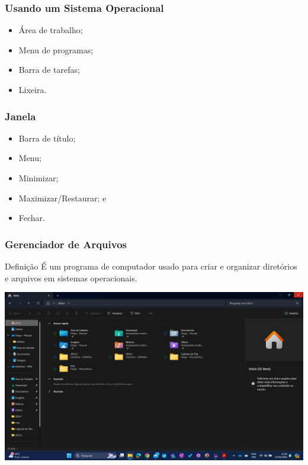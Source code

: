 \documentclass[aspectratio=169]{beamer} %
\begin{document}
\begin{frame}
	\frametitle{Usando um Sistema Operacional}
	
	\begin{itemize}
		\item Área de trabalho;
		\item Menu de programas;
		\item Barra de tarefas;
		\item Lixeira.
	\end{itemize}
\end{frame}

\begin{frame}
	\frametitle{Janela}
	
	\begin{itemize}
		\item Barra de título;
		\item Menu;
		\item Minimizar;
		\item Maximizar/Restaurar; e
		\item Fechar.
	\end{itemize}
\end{frame}

\begin{frame}
	\frametitle{Gerenciador de Arquivos}
	
	\begin{block}{Definição}
		 É um programa de computador usado para criar e organizar diretórios e arquivos em sistemas operacionais.
	\end{block}
	
	\begin{center}
		\includegraphics[scale=0.1]{img/explorador-de-arquivos}
	\end{center}
\end{frame}
\end{document}
